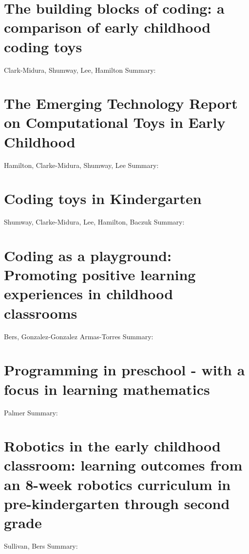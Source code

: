 \documentclass[12pt]{extarticle}
\begin{document}
\section{The building blocks of coding: a comparison of early childhood coding toys}
Clark-Midura, Shumway, Lee, Hamilton
Summary:	

\section{The Emerging Technology Report on Computational Toys in Early Childhood}
Hamilton, Clarke-Midura, Shumway, Lee
Summary:	


\section{Coding toys in Kindergarten}
Shumway, Clarke-Midura, Lee, Hamilton, Baczuk
Summary:	


\section{Coding as a playground: Promoting positive learning experiences in childhood classrooms}
Bers, Gonzalez-Gonzalez Armas-Torres
Summary:	


\section{Programming in preschool - with a focus in learning mathematics}
Palmer
Summary:	


\section{Robotics in the early childhood classroom: learning outcomes from an 8-week robotics curriculum in pre-kindergarten through second grade}
Sullivan, Bers
Summary:	
\end{document}
